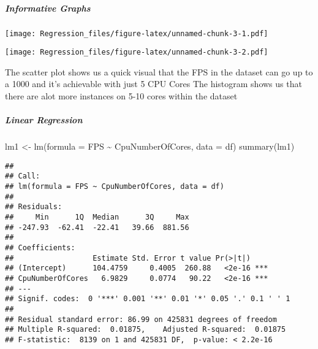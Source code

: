 \documentclass[
]{article}
\newenvironment{Shaded}{\begin{snugshade}}{\end{snugshade}}
\newcommand{\AttributeTok}[1]{\textcolor[rgb]{0.77,0.63,0.00}{#1}}
\newcommand{\FunctionTok}[1]{\textcolor[rgb]{0.00,0.00,0.00}{#1}}
\newcommand{\NormalTok}[1]{#1}
\newcommand{\OtherTok}[1]{\textcolor[rgb]{0.56,0.35,0.01}{#1}}
\newcommand{\SpecialCharTok}[1]{\textcolor[rgb]{0.00,0.00,0.00}{#1}}
\newcommand{\StringTok}[1]{\textcolor[rgb]{0.31,0.60,0.02}{#1}}
\begin{document}
\hypertarget{informative-graphs}{%
\subparagraph{Informative Graphs}\label{informative-graphs}}

\begin{Shaded}
\end{Shaded}

\texttt{[image: Regression\_files/figure-latex/unnamed-chunk-3-1.pdf]}

\begin{Shaded}
\end{Shaded}

\texttt{[image: Regression\_files/figure-latex/unnamed-chunk-3-2.pdf]}

The scatter plot shows us a quick visual that the FPS in the dataset can
go up to a 1000 and it's achievable with just 5 CPU Cores The histogram
shows us that there are alot more instances on 5-10 cores within the
dataset

\hypertarget{linear-regression}{%
\subparagraph{Linear Regression}\label{linear-regression}}

\begin{Shaded}
\begin{Highlighting}[]
\NormalTok{lm1 }\OtherTok{\textless{}{-}} \FunctionTok{lm}\NormalTok{(}\AttributeTok{formula =}\NormalTok{ FPS }\SpecialCharTok{\textasciitilde{}}\NormalTok{ CpuNumberOfCores, }\AttributeTok{data =}\NormalTok{ df)}
\FunctionTok{summary}\NormalTok{(lm1)}
\end{Highlighting}
\end{Shaded}

\begin{verbatim}
## 
## Call:
## lm(formula = FPS ~ CpuNumberOfCores, data = df)
## 
## Residuals:
##     Min      1Q  Median      3Q     Max 
## -247.93  -62.41  -22.41   39.66  881.56 
## 
## Coefficients:
##                  Estimate Std. Error t value Pr(>|t|)    
## (Intercept)      104.4759     0.4005  260.88   <2e-16 ***
## CpuNumberOfCores   6.9829     0.0774   90.22   <2e-16 ***
## ---
## Signif. codes:  0 '***' 0.001 '**' 0.01 '*' 0.05 '.' 0.1 ' ' 1
## 
## Residual standard error: 86.99 on 425831 degrees of freedom
## Multiple R-squared:  0.01875,    Adjusted R-squared:  0.01875 
## F-statistic:  8139 on 1 and 425831 DF,  p-value: < 2.2e-16
\end{verbatim}
\end{document}
